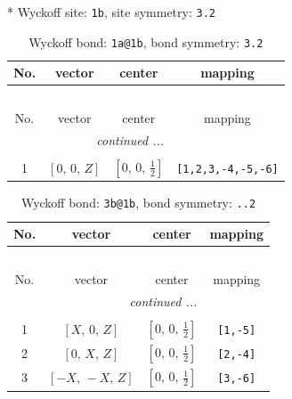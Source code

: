 \documentclass[fleqn,8pt]{jsarticle}
\begin{document}
* Wyckoff site: {\tt 1b}, site symmetry: {\tt 3.2}
\renewcommand{\arraystretch}{1.2}
\begin{longtable}{cccc}
\caption{Wyckoff bond: {\tt 1a@1b}, bond symmetry: {\tt 3.2}}
 \\
 \hline \hline
No. & vector & center & mapping \\ \hline \endfirsthead

\multicolumn{3}{l}{\tablename\ \thetable{}} \\
 \hline \hline
No. & vector & center & mapping \\ \hline \endhead

 \hline \hline
\multicolumn{3}{r}{\footnotesize\it continued ...} \\ \endfoot

 \hline \hline
\multicolumn{3}{r}{} \\ \endlastfoot

1 & $\left[ 0,\, 0,\, Z \right]$ & $\left[ 0,\, 0,\, \frac{1}{2} \right]$ & {\tt [1,2,3,-4,-5,-6]} \\
\end{longtable}
\renewcommand{\arraystretch}{1.2}
\begin{longtable}{cccc}
\caption{Wyckoff bond: {\tt 3b@1b}, bond symmetry: {\tt ..2}}
 \\
 \hline \hline
No. & vector & center & mapping \\ \hline \endfirsthead

\multicolumn{3}{l}{\tablename\ \thetable{}} \\
 \hline \hline
No. & vector & center & mapping \\ \hline \endhead

 \hline \hline
\multicolumn{3}{r}{\footnotesize\it continued ...} \\ \endfoot

 \hline \hline
\multicolumn{3}{r}{} \\ \endlastfoot

1 & $\left[ X,\, 0,\, Z \right]$ & $\left[ 0,\, 0,\, \frac{1}{2} \right]$ & {\tt [1,-5]} \\ \hline
2 & $\left[ 0,\, X,\, Z \right]$ & $\left[ 0,\, 0,\, \frac{1}{2} \right]$ & {\tt [2,-4]} \\ \hline
3 & $\left[ - X,\, - X,\, Z \right]$ & $\left[ 0,\, 0,\, \frac{1}{2} \right]$ & {\tt [3,-6]} \\
\end{longtable}
\renewcommand{\arraystretch}{1.2}
\end{document}
